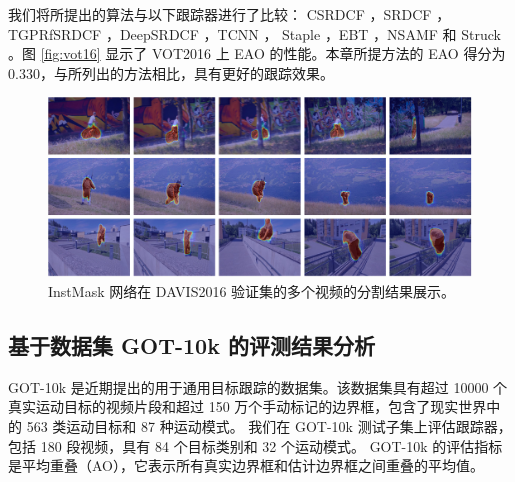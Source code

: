 我们将所提出的算法与以下跟踪器进行了比较：
CSRDCF \cite{Lukezic2017DiscriminativeCF}，SRDCF \cite{Danelljan2015LearningSR}，TGPRfSRDCF \cite{gao2018tracking}，DeepSRDCF \cite{Danelljan2015ConvolutionalFF}，TCNN \cite{nam2016modeling}， Staple \cite{Bertinetto2016StapleC}，EBT \cite{Zhu2016BeyondLS}，NSAMF \cite{Hua2015OnlineOT} 和 Struck \cite{Hare2011StruckSO}。图 \ref{fig:vot16} 显示了 VOT2016 上 EAO 的性能。本章所提方法的 EAO 得分为 0.330，与所列出的方法相比，具有更好的跟踪效果。

\begin{figure}[t!]
\centering
\includegraphics[width=\textwidth]{Img/IGCF/davis.pdf}
\caption{InstMask 网络在 DAVIS2016 验证集的多个视频的分割结果展示。}
\label{fig:davis}
\end{figure}

\subsection{基于数据集 GOT-10k 的评测结果分析}
GOT-10k \cite{GOT-10k} 是近期提出的用于通用目标跟踪的数据集。该数据集具有超过 10000 个真实运动目标的视频片段和超过 150 万个手动标记的边界框，包含了现实世界中的 563 类运动目标和 87 种运动模式。
我们在 GOT-10k 测试子集上评估跟踪器，包括 180 段视频，具有 84 个目标类别和 32 个运动模式。
GOT-10k 的评估指标是平均重叠（AO），它表示所有真实边界框和估计边界框之间重叠的平均值。

